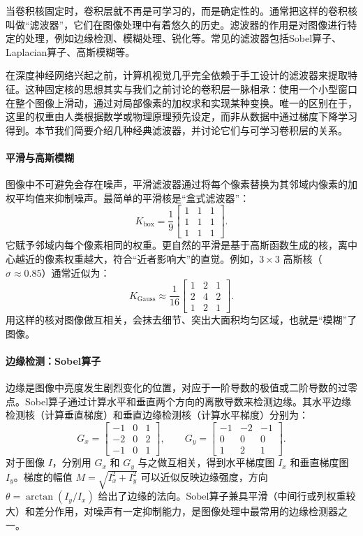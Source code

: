 当卷积核固定时，卷积层就不再是可学习的，而是确定性的。通常把这样的卷积核叫做“滤波器”，它们在图像处理中有着悠久的历史。滤波器的作用是对图像进行特定的处理，例如边缘检测、模糊处理、锐化等。常见的滤波器包括Sobel算子、Laplacian算子、高斯模糊等。

在深度神经网络兴起之前，计算机视觉几乎完全依赖于手工设计的滤波器来提取特征。这种固定核的思想其实与我们之前讨论的卷积层一脉相承：使用一个小型窗口在整个图像上滑动，通过对局部像素的加权求和实现某种变换。唯一的区别在于，这里的权重由人类根据数学或物理原理预先设定，而非从数据中通过梯度下降学习得到。本节我们简要介绍几种经典滤波器，并讨论它们与可学习卷积层的关系。

\paragraph{平滑与高斯模糊}
图像中不可避免会存在噪声，平滑滤波器通过将每个像素替换为其邻域内像素的加权平均值来抑制噪声。最简单的平滑核是“盒式滤波器”：
\[
K_{\text{box}} = \frac{1}{9}\begin{bmatrix}
1 & 1 & 1 \\
1 & 1 & 1 \\
1 & 1 & 1
\end{bmatrix}.
\]
它赋予邻域内每个像素相同的权重。更自然的平滑是基于高斯函数生成的核，离中心越近的像素权重越大，符合“近者影响大”的直觉。例如，$3\times3$ 高斯核（$\sigma\approx 0.85$）通常近似为：
\[
K_{\text{Gauss}} \approx \frac{1}{16}\begin{bmatrix}
1 & 2 & 1 \\
2 & 4 & 2 \\
1 & 2 & 1
\end{bmatrix}.
\]
用这样的核对图像做互相关，会抹去细节、突出大面积均匀区域，也就是“模糊”了图像。

\paragraph{边缘检测：Sobel算子}
边缘是图像中亮度发生剧烈变化的位置，对应于一阶导数的极值或二阶导数的过零点。Sobel算子通过计算水平和垂直两个方向的离散导数来检测边缘。其水平边缘检测核（计算垂直梯度）和垂直边缘检测核（计算水平梯度）分别为：
\[
G_x = \begin{bmatrix}
-1 & 0 & 1 \\
-2 & 0 & 2 \\
-1 & 0 & 1
\end{bmatrix},\qquad
G_y = \begin{bmatrix}
-1 & -2 & -1 \\
 0 &  0 &  0 \\
 1 &  2 &  1
\end{bmatrix}.
\]
对于图像 $I$，分别用 $G_x$ 和 $G_y$ 与之做互相关，得到水平梯度图 $I_x$ 和垂直梯度图 $I_y$。梯度的幅值 $M = \sqrt{I_x^2 + I_y^2}$ 可以近似反映边缘强度，方向 $\theta = \arctan(I_y / I_x)$ 给出了边缘的法向。Sobel算子兼具平滑（中间行或列权重较大）和差分作用，对噪声有一定抑制能力，是图像处理中最常用的边缘检测器之一。

